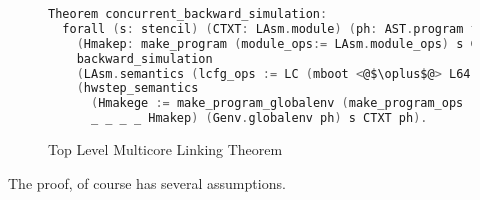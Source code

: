\begin{figure}
\begin{lstlisting}[language=C]
Theorem concurrent_backward_simulation:
  forall (s: stencil) (CTXT: LAsm.module) (ph: AST.program fundef unit)
    (Hmakep: make_program (module_ops:= LAsm.module_ops) s CTXT (mboot <@$\oplus$@> L64) = OK ph),
    backward_simulation
    (LAsm.semantics (lcfg_ops := LC (mboot <@$\oplus$@> L64)) ph)          
    (hwstep_semantics 
      (Hmakege := make_program_globalenv (make_program_ops := make_program_ops) 
      _ _ _ _ Hmakep) (Genv.globalenv ph) s CTXT ph).
\end{lstlisting}
\caption{Top Level Multicore Linking Theorem}
\label{fig:chapter:certikos:top-level-multicore-theorem}
\end{figure}

The proof, of course has several assumptions. 

